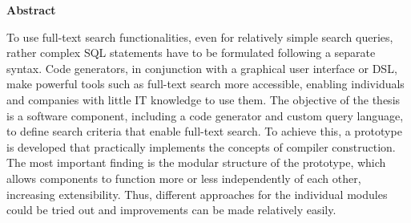 \begin{center}
    \Large
    \textbf{\myTitel}

    \vspace{0.4cm}
    \large
    \myAutor

    \vspace{0.9cm}
    \textbf{Abstract}
\end{center}
To use full-text search functionalities, even for relatively simple search queries, rather complex SQL statements have to be formulated following a separate syntax.
Code generators, in conjunction with a graphical user interface or DSL, make powerful tools such as full-text search more accessible, enabling individuals and companies with little IT knowledge to use them.
The objective of the thesis is a software component, including a code generator and custom query language, to define search criteria that enable full-text search.
To achieve this, a prototype is developed that practically implements the concepts of compiler construction.
The most important finding is the modular structure of the prototype, which allows components to function more or less independently of each other, increasing extensibility.
Thus, different approaches for the individual modules could be tried out and improvements can be made relatively easily.
\newpage